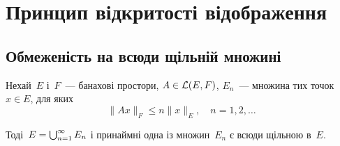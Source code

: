 \chapter{Принцип відкритості відображення}

\section{Обмеженість на всюди щільній множині}

\begin{lemma}
Нехай~$E$ і~$F$~--- банахові простори,
$A \in \mathcal{L}(E, F)$, $E_n$~--- множина тих точок~$x \in E$, для яких
\begin{equation*}
    \|A x\|_F \le n \|x\|_E, \quad n = 1, 2, \dots    
\end{equation*}

Тоді~$E = \operatorname*{\bigcup}_{n = 1}^\infty E_n$ і принаймні одна із множин~$E_n$ є всюди
щільною в~$E$.
\end{lemma}

